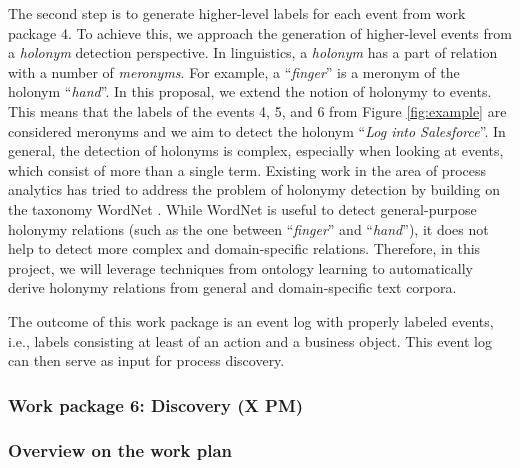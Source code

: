  The second step is to generate higher-level labels for each event from work package 4. To achieve this, we approach the generation of higher-level events from a \textit{holonym} detection perspective. In linguistics, a \textit{holonym} has a part of relation with a number of \textit{meronyms}. For example, a ``\textit{finger}'' is a meronym of the holonym ``\textit{hand}''. In this proposal, we extend the notion of holonymy to events. This means that the labels of the events 4, 5, and 6 from Figure \ref{fig:example} are considered meronyms and we aim to detect the holonym ``\textit{Log into Salesforce}''. In general, the detection of holonyms is complex, especially when looking at events, which consist of more than a single term. Existing work in the area of process analytics has tried to address the problem of holonymy detection by building on the taxonomy WordNet \cite{leopold2014simplifying}. While WordNet is useful to detect general-purpose holonymy relations (such as the one between ``\textit{finger}'' and ``\textit{hand}''), it does not help to detect more complex and domain-specific relations. Therefore, in this project, we will leverage techniques from ontology learning \cite{al2020automatic,wong2012ontology} to automatically derive holonymy relations from general and domain-specific text corpora.    

 The outcome of this work package is an event log with properly labeled events, i.e., labels consisting at least of an action and a business object. This event log can then serve as input for process discovery. 


\subsubsection{Work package 6: Discovery (X PM)}
\label{sec:wp6}


\subsubsection{Overview on the work plan}

